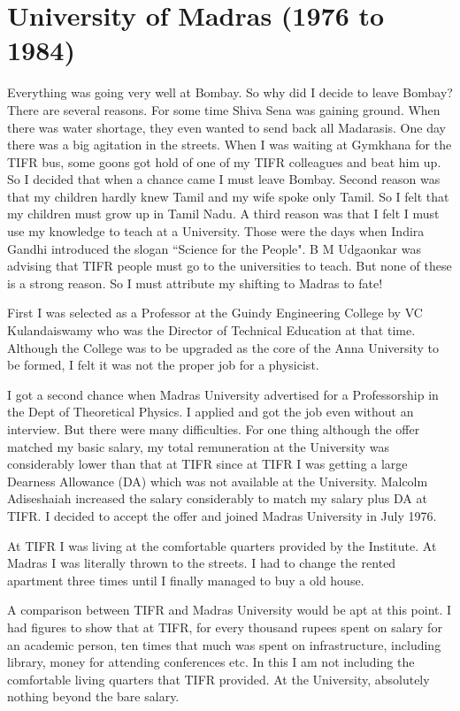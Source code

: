 \section*{University of Madras (1976 to 1984)}
\vskip -10pt
Everything was going very well at Bombay. So why did I decide to leave 
Bombay? There are several reasons. For some time Shiva Sena was gaining 
ground. When there was water shortage, they even wanted to send back all 
Madarasis. One day there was a big agitation in the streets. When I was 
waiting at Gymkhana for the TIFR bus, some goons got hold of one of my 
TIFR colleagues and beat him up. So I decided that when a chance came I 
must leave Bombay. Second reason was that my children hardly knew Tamil 
and my wife spoke only Tamil. So I felt that my children must grow up in 
Tamil Nadu. A third reason was that I felt I must use my knowledge to 
teach at a University. Those were the days when Indira Gandhi introduced 
the slogan ``Science for the People". B M Udgaonkar was advising that 
TIFR people must go to the universities to teach. But none of these is a 
strong reason. So I must attribute my shifting to Madras to fate!

First I was selected as a Professor at the Guindy Engineering College by 
VC Kulandaiswamy who was the Director of Technical Education at that 
time. Although the College was to be upgraded as the core of the Anna 
University to be formed, I felt it was not the proper job for a 
physicist.

I got a second chance when Madras University advertised for a 
Professorship in the Dept of Theoretical Physics. I applied and got the 
job even without an interview. But there were many difficulties. For one 
thing although the offer matched my basic salary, my total remuneration 
at the University was conside\-rably lower than that at TIFR since at TIFR 
I was getting a large Dearness Allowance (DA) which was not available at 
the University. Malcolm Adiseshaiah increased the salary considerably to 
match my salary plus DA at TIFR. I decided to accept the offer and 
joined Madras University in July 1976.

At TIFR I was living at the comfortable quarters provided by the 
Institute. At Madras I was literally thrown to the streets. I had to 
change the rented apartment three times until I finally managed to buy a 
old house.

A comparison between TIFR and Madras University would be apt at this 
point. I had figures to show that at TIFR, for eve\-ry thousand rupees 
spent on salary for an academic person, ten times that much was spent on 
infrastructure, including library, money for attending conferences etc. 
In this I am not inclu\-ding the comfortable living quarters that TIFR 
provided. At the University, absolutely nothing beyond the bare salary.

